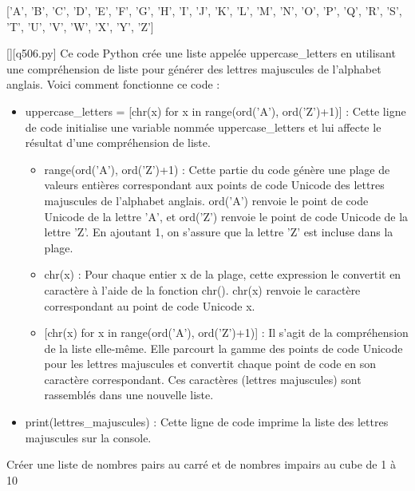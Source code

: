 ['A', 'B', 'C', 'D', 'E', 'F', 'G', 'H', 'I', 'J', 'K', 'L', 'M', 'N', 'O', 'P', 'Q', 'R', 'S', 'T', 'U', 'V', 'W', 'X', 'Y', 'Z']
        \par
        \begin{solution}
            \renewcommand{\nomfichier}{q506.py}
            \pythonfile{\chemincode \nomfichier}[][\nomfichier]
            Ce code Python crée une liste appelée uppercase\_letters en utilisant une compréhension de liste pour générer des lettres majuscules de l'alphabet anglais. Voici comment fonctionne ce code :\par

\begin{itemize}
\item     uppercase\_letters = [chr(x) for x in range(ord('A'), ord('Z')+1)] : Cette ligne de code initialise une variable nommée uppercase\_letters et lui affecte le résultat d'une compréhension de liste.

 \begin{itemize}
 \item        range(ord('A'), ord('Z')+1) : Cette partie du code génère une plage de valeurs entières correspondant aux points de code Unicode des lettres majuscules de l'alphabet anglais. ord('A') renvoie le point de code Unicode de la lettre 'A', et ord('Z') renvoie le point de code Unicode de la lettre 'Z'. En ajoutant 1, on s'assure que la lettre 'Z' est incluse dans la plage.
 \item         chr(x) : Pour chaque entier x de la plage, cette expression le convertit en caractère à l'aide de la fonction chr(). chr(x) renvoie le caractère correspondant au point de code Unicode x.
 \item{}         [chr(x) for x in range(ord('A'), ord('Z')+1)] : Il s'agit de la compréhension de la liste elle-même. Elle parcourt la gamme des points de code Unicode pour les lettres majuscules et convertit chaque point de code en son caractère correspondant. Ces caractères (lettres majuscules) sont rassemblés dans une nouvelle liste.
 \end{itemize}
\item    print(lettres\_majuscules) : Cette ligne de code imprime la liste des lettres majuscules sur la console.
 \end{itemize}
        \end{solution}
        

        \question
        Créer une liste de nombres pairs au carré et de nombres impairs au cube de 1 à 10

